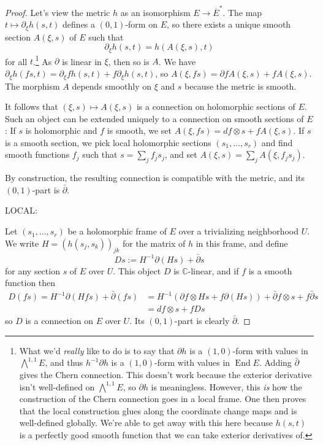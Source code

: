 \documentclass[11pt]{article}
\newtheorem*{proof}{Proof}
\newcommand{\kk}[1]{\mathbb{#1}}
\DeclareMathOperator{\End}{End}
\begin{document}
\begin{proof}
Let's view the metric $h$ as an isomorphism $E \to \overline E^*$. The map $t \mapsto \partial_\xi h(s, t)$ defines a $(0,1)$-form on $E$, so there exists a unique smooth section $A(\xi,s)$ of $E$ such that
$$
\partial_\xi h(s, t) = h(A(\xi, s), t)
$$
for all $t$.\footnote{What we'd \emph{really} like to do is to say that $\partial h$ is a $(1,0)$-form with values in $\bigwedge^{1,1}E$, and thus $h^{-1}\partial h$ is a $(1,0)$-form with values in $\End E$. Adding $\bar\partial$ gives the Chern connection. This doesn't work because the exterior derivative isn't well-defined on $\bigwedge^{1,1}E$, so $\partial h$ is meaningless. However, this \emph{is} how the construction of the Chern connection goes in a local frame. One then proves that the local construction glues along the coordinate change maps and is well-defined globally. We're able to get away with this here because $h(s,t)$ is a perfectly good smooth function that we can take exterior derivatives of.}
As $\partial$ is linear in $\xi$, then so is $A$. We have $\partial_\xi h(f s, t) = \partial_\xi f h(s,t) + f \partial_\xi h(s, t)$, so $A(\xi, fs) = \partial f A(\xi, s) + f A(\xi, s)$. The morphism $A$ depends smoothly on $\xi$ and $s$ because the metric is smooth.

It follows that $(\xi, s) \mapsto A(\xi, s)$ is a connection on holomorphic sections of $E$. Such an object can be extended uniquely to a connection on smooth sections of $E$: If $s$ is holomorphic and $f$ is smooth, we set $A(\xi, f s) = df \otimes s + f A(\xi, s)$. If $s$ is a smooth section, we pick local holomorphic sections $(s_1, \ldots, s_r)$ and find smooth functions $f_j$ such that $s = \sum_j f_j s_j$, and set $A(\xi,s) = \sum_j A(\xi, f_j s_j)$.

By construction, the resulting connection is compatible with the metric, and its $(0,1)$-part is $\bar\partial$.


LOCAL:

Let $(s_1, \ldots, s_r)$ be a holomorphic frame of $E$ over a trivializing neighborhood $U$. We write $H = (h(s_j, s_k))_{jk}$ for the matrix of $h$ in this frame, and define
$$
D s := H^{-1}\partial (H s) + \bar\partial s
$$
for any section $s$ of $E$ over $U$. This object $D$ is $\kk C$-linear, and if $f$ is a smooth function then
\begin{align*}
D(fs)
= H^{-1}\partial (H fs) + \bar\partial (fs)
&= H^{-1}(\partial f \otimes Hs + f\partial( H s)) + \bar\partial f \otimes s + f \bar\partial s
\\
&= df \otimes s + f Ds
\end{align*}
so $D$ is a connection on $E$ over $U$. Its $(0,1)$-part is clearly $\bar\partial$.


\end{proof}
\end{document}
